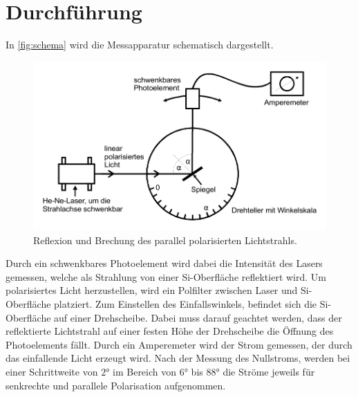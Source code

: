 \section{Durchführung}
\label{sec:Durchführung}

In \autoref{fig:schema} wird die Messapparatur schematisch dargestellt.
\begin{figure}
    \centering
    \includegraphics[width=0.8\linewidth]{pictures/schema.pdf}
    \caption{Reflexion und Brechung des parallel polarisierten Lichtstrahls. \cite{v407}}
    \label{fig:schema}
\end{figure}

Durch ein schwenkbares Photoelement wird dabei die Intensität des Lasers gemessen,
welche als Strahlung von einer Si-Oberfläche reflektiert wird.
Um polarisiertes Licht herzustellen, wird ein Polfilter zwischen Laser und Si-Oberfläche platziert.
Zum Einstellen des Einfallswinkels, befindet sich die Si-Oberfläche auf einer Drehscheibe.
Dabei muss darauf geachtet werden, dass der reflektierte Lichtstrahl auf einer festen Höhe der Drehscheibe
die Öffnung des Photoelements fällt.
Durch ein Amperemeter wird der Strom gemessen, der durch das einfallende Licht erzeugt wird.
Nach der Messung des Nullstroms, werden bei einer Schrittweite von $\ang{2;;}$ im Bereich von $\ang{6;;}$ 
bis $\ang{88;;}$ die Ströme jeweils für senkrechte und parallele Polarisation aufgenommen.